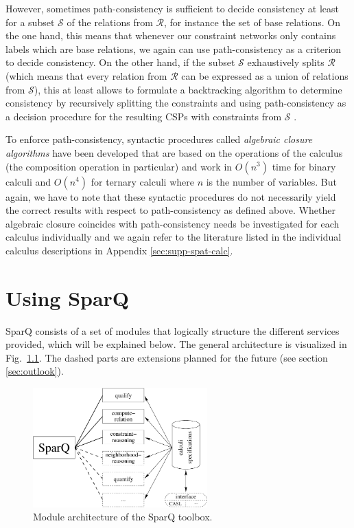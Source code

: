\documentclass[headsepline]{scrreprt}
\theoremstyle{definition}
\newcommand{\engine}{SparQ}
\begin{document}
However, sometimes path-consistency is sufficient to decide consistency
at least for a subset $\mathcal{S}$ of the relations from $\mathcal{R}$,
for instance
the set of base relations. On the one hand, this means that whenever
our constraint networks only contains labels which are base relations,
we again can use path-consistency as a criterion to decide consistency.
On the other hand, if the subset $\mathcal{S}$ exhaustively splits
$\mathcal{R}$ (which means that every relation from $\mathcal{R}$ can be
expressed as a union of relations from $\mathcal{S}$), this at least
allows to formulate a backtracking algorithm to determine consistency
by recursively splitting the constraints and using path-consistency
as a decision procedure for the resulting CSPs with constraints from
$\mathcal{S}$ \citep{ladkin92_qualCSP}.

To enforce path-consistency, syntactic procedures called \emph{algebraic
closure algorithms} have been developed that are based
on the operations of the calculus (the composition operation in
particular) and work in $O(n^3)$
time for binary calculi and $O(n^4)$ for ternary calculi
where $n$ is the number of variables.
But again, we have to note
that these syntactic procedures do not necessarily yield the correct
results with respect to path-consistency as defined above.
Whether algebraic closure coincides
with path-consistency
needs be investigated for each calculus individually and we
again refer to the literature listed in the individual calculus descriptions
in Appendix \ref{sec:supp-spat-calc}.



\chapter{Using \engine}\label{sec:using-ri-engine}

\engine{} consists of a set of modules that logically structure
the different services provided, which will be explained below.
The general architecture is visualized in Fig.~\ref{fig:SparQ_Arch}.
The dashed parts are extensions planned for the future (see section
\ref{sec:outlook}).

\begin{figure}[ht]
 	\centering
	\includegraphics[width=0.6\textwidth]{SparQ_Structure}
	\caption{Module architecture of the SparQ toolbox.}
	\label{fig:SparQ_Arch}
\end{figure}
\end{document}
